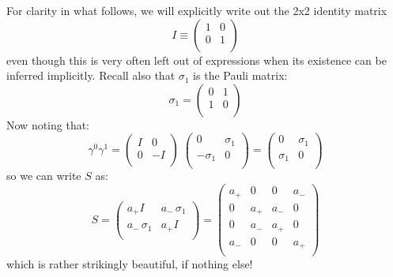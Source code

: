 \documentclass[12pt]{book}
\begin{document}
For clarity in what follows, we will explicitly write out the 2x2 identity matrix 
$$I \equiv \begin{pmatrix} 
1 & 0 \\
0 & 1 \\
\end{pmatrix}
$$
even though this is very often left out of expressions when its existence can be inferred implicitly.  Recall also that $\sigma_1$ is the Pauli matrix:
$$\sigma_1 = \begin{pmatrix} 
0 & 1 \\ 
1 & 0 \\
\end{pmatrix}
$$
Now noting that:
$$\gamma^0 \gamma^1 = 
\begin{pmatrix} 
I &  0 \\ 
0 & -I \\
\end{pmatrix}
\;
\begin{pmatrix} 
0 & \sigma_1 \\ 
-\sigma_1 & 0 \\
\end{pmatrix}
=
\begin{pmatrix} 
0 & \sigma_1 \\ 
\sigma_1 & 0 \\
\end{pmatrix}
$$
so we can write $S$ as:
$$S = \begin{pmatrix} 
a_+ I & a_- \, \sigma_1 \\ 
a_- \, \sigma_1 & a_+ I \\
\end{pmatrix}
= \begin{pmatrix} 
a_+ & 0 & 0   & a_- \\
0 & a_+ & a_- & 0 \\
0 & a_- & a_+ & 0 \\
a_- & 0 & 0 & a_+ \\
\end{pmatrix}
$$
which is rather strikingly beautiful, if nothing else!  
\end{document}
